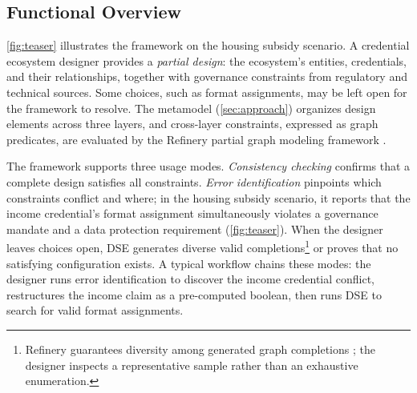 \subsection{Functional Overview}\label{sec:functional-overview}

\autoref{fig:teaser} illustrates the framework on the housing subsidy scenario. A credential ecosystem designer provides a \emph{partial design}: the ecosystem's entities, credentials, and their relationships, together with governance constraints from regulatory and technical sources. Some choices, such as format assignments, may be left open for the framework to resolve. The metamodel (\autoref{sec:approach}) organizes design elements across three layers, and cross-layer constraints, expressed as graph predicates, are evaluated by the Refinery partial graph modeling framework \citep{marussy_refinery_2024}.

The framework supports three usage modes. \emph{Consistency checking} confirms that a complete design satisfies all constraints. \emph{Error identification} pinpoints which constraints conflict and where; in the housing subsidy scenario, it reports that the income credential's format assignment simultaneously violates a governance mandate and a data protection requirement (\autoref{fig:teaser}). When the designer leaves choices open, \acf{DSE} generates diverse valid completions\footnote{Refinery guarantees diversity among generated graph completions \citep{marussy_refinery_2024}; the designer inspects a representative sample rather than an exhaustive enumeration.} or proves that no satisfying configuration exists. A typical workflow chains these modes: the designer runs error identification to discover the income credential conflict, restructures the income claim as a pre-computed boolean, then runs \ac{DSE} to search for valid format assignments.
